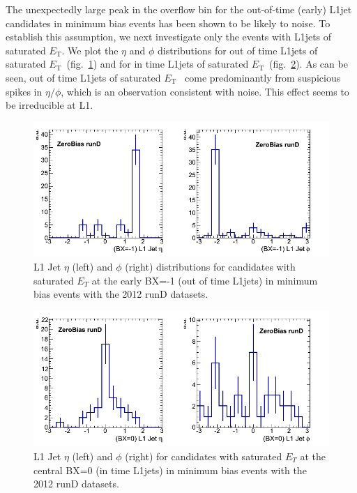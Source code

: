 \documentclass[11pt]{cmspaperpdf}
\newcommand{\et}{\ensuremath{E_{\textrm{T}}}}
\begin{document}
The unexpectedly large peak in the overflow bin for the out-of-time (early) L1jet candidates in minimum bias events has been shown to be likely to noise. 
To establish this assumption, we next investigate only the events with L1jets of saturated \et. We plot the $\eta$ and $\phi$ distributions for out of time L1jets of saturated \et~(fig.~\ref{fig:early_eta_phi}) and for in time L1jets of saturated \et~(fig.~\ref{fig:central_eta_phi}). As can be seen, out of time L1jets of saturated \et~ come predominantly from suspicious spikes in $\eta/\phi$, which is an observation consistent with noise. This effect seems to be irreducible at L1.

\begin{figure}
\centering
\includegraphics[scale=0.5]{plots/early_l1Jet_withSaturatedEt_eta_phi_ZeroBias_runD.png}
\caption{L1 Jet $\eta$ (left) and $\phi$ (right) distributions for candidates with saturated $E_{T}$ at the early BX=-1 (out of time L1jets) in minimum bias events with the 2012 runD datasets. }
\label{fig:early_eta_phi} 
\end{figure}
\begin{figure}
\centering
\includegraphics[scale=0.5]{plots/central_l1Jet_withSaturatedEt_eta_phi_ZeroBias_runD.png}
\caption{L1 Jet $\eta$ (left) and $\phi$ (right) for candidates with saturated $E_{T}$ at the central BX=0 (in time L1jets) in minimum bias events with the 2012 runD datasets.} 
\label{fig:central_eta_phi} 
\end{figure}
\end{document}
